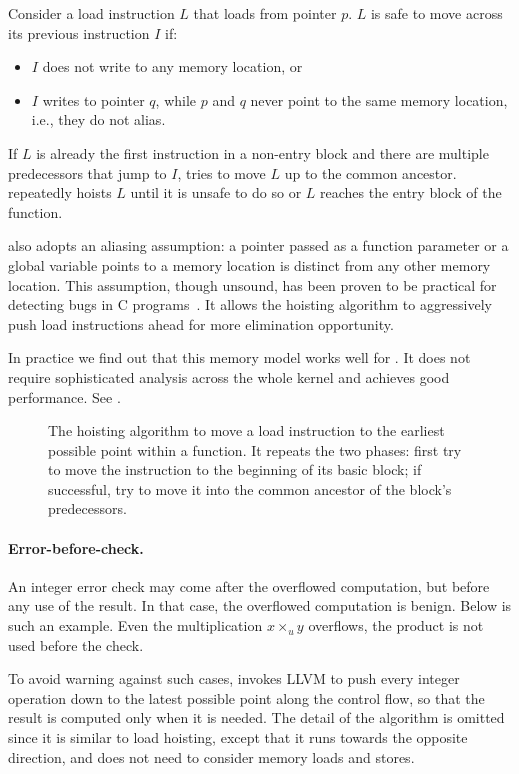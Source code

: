Consider a load instruction $L$ that loads from pointer $p$.  $L$ is
safe to move across its previous instruction $I$ if:
\begin{itemize}
\item $I$ does not write to any memory location, or
\item $I$ writes to pointer $q$, while $p$ and $q$ never point to the
same memory location, i.e., they do not alias.
\end{itemize}

If $L$ is already the first instruction in a non-entry block and
there are multiple predecessors that jump to $I$, \sys tries to
move $L$ up to the common ancestor.  \sys repeatedly hoists $L$
until it is unsafe to do so or $L$ reaches the entry block of the
function.

\sys also adopts an aliasing assumption: a pointer passed as a
function parameter or a global variable points to a memory location
is distinct from any other memory location.  This assumption, though
unsound, has been proven to be practical for detecting bugs in C
programs~\cite{livshits:ipssa}.  It allows the hoisting algorithm
to aggressively push load instructions ahead for more elimination
opportunity.

In practice we find out that this memory model works well for \sys.
It does not require sophisticated analysis across the whole kernel
and achieves good performance.  See .

\begin{figure}

\caption{The hoisting algorithm to move a load instruction to the
earliest possible point within a function.  It repeats the two
phases: first try to move the instruction to the beginning of its
basic block; if successful, try to move it into the common ancestor
of the block's predecessors.}
\label{f:hoist}
\end{figure}
\fi

\paragraph{Error-before-check.}
An integer error check may come after the overflowed computation,
but before any use of the result.  In that case, the overflowed
computation is benign.  Below is such an example.  Even the
multiplication $x \times_u y$ overflows, the product  is
not used before the check.


To avoid warning against such cases, \sys invokes LLVM to push every
integer operation down to the latest possible point along the control
flow, so that the result is computed only when it is needed.  The
detail of the algorithm is omitted since it is similar to load
hoisting, except that it runs towards the opposite direction, and
does not need to consider memory loads and stores.

